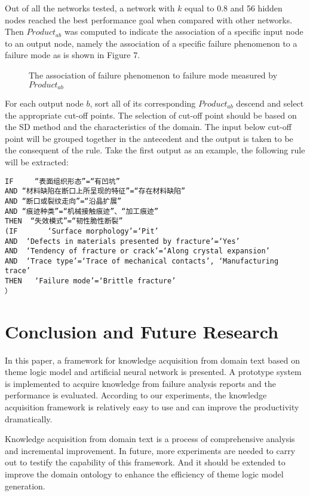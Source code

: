 \documentclass{elsarticle}
\begin{document}
Out of all the networks tested, a network with $k$ equal to 0.8 and 56
hidden nodes reached the best performance goal when compared with
other networks. Then $Product_{ab}$  was computed to indicate the
association of a specific input node to an output node, namely the
association of a specific failure phenomenon to a failure mode as is
shown in Figure 7. 

 \begin{figure}[htb]
  \centering
  \caption{The association of failure phenomenon to failure mode measured by $Product_{ab}$
}
\label{fig:7}
\end{figure}

For each output node $b$, sort all of its corresponding $Product_{ab}$
descend and select the appropriate cut-off points. The selection of
cut-off point should be based on the SD method and the characteristics
of the domain. The input below cut-off point will be grouped together
in the antecedent and the output is taken to be the consequent of the
rule. Take the first output as an example, the following rule will be
extracted:
\begin{verbatim}
IF     “表面组织形态”=“有凹坑” 
AND “材料缺陷在断口上所呈现的特征”=“存在材料缺陷”
AND “断口或裂纹走向”=“沿晶扩展”
AND “痕迹种类”=“机械接触痕迹”、“加工痕迹”
THEN  “失效模式”=“韧性脆性断裂”
(IF       ‘Surface morphology’=‘Pit’ 
AND  ‘Defects in materials presented by fracture’=‘Yes’
AND  ‘Tendency of fracture or crack’=‘Along crystal expansion’
AND  ‘Trace type’=‘Trace of mechanical contacts’, ‘Manufacturing trace’
THEN   ‘Failure mode’=‘Brittle fracture’
）

\end{verbatim}

\section{Conclusion and Future Research 
}
\label{sec:concl-future-rese}

In this paper, a framework for knowledge acquisition from domain text
based on theme logic model and artificial neural network is
presented. A prototype system is implemented to acquire knowledge from
failure analysis reports and the performance is evaluated. According
to our experiments, the knowledge acquisition framework is relatively
easy to use and can improve the productivity dramatically. 

Knowledge acquisition from domain text is a process of comprehensive
analysis and incremental improvement. In future, more experiments are
needed to carry out to testify the capability of this framework. And
it should be extended to improve the domain ontology to enhance the
efficiency of theme logic model generation.
\end{document}
